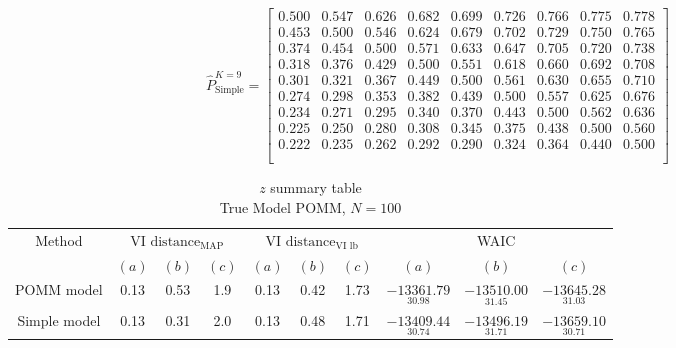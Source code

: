 \documentclass[11pt]{amsart}
\begin{document}
\[ 
\hat{P}^{K=9}_{\text{Simple}} = 
\left[\begin{array}{ccccccccc}
0.500 & 0.547 & 0.626 & 0.682 & 0.699 & 0.726 & 0.766 & 0.775 & 0.778 \\
0.453 & 0.500 & 0.546 & 0.624 & 0.679 & 0.702 & 0.729 & 0.750 & 0.765 \\
0.374 & 0.454 & 0.500 & 0.571 & 0.633 & 0.647 & 0.705 & 0.720 & 0.738 \\
0.318 & 0.376 & 0.429 & 0.500 & 0.551 & 0.618 & 0.660 & 0.692 & 0.708 \\
0.301 & 0.321 & 0.367 & 0.449 & 0.500 & 0.561 & 0.630 & 0.655 & 0.710 \\
0.274 & 0.298 & 0.353 & 0.382 & 0.439 & 0.500 & 0.557 & 0.625 & 0.676 \\
0.234 & 0.271 & 0.295 & 0.340 & 0.370 & 0.443 & 0.500 & 0.562 & 0.636 \\
0.225 & 0.250 & 0.280 & 0.308 & 0.345 & 0.375 & 0.438 & 0.500 & 0.560 \\
0.222 & 0.235 & 0.262 & 0.292 & 0.290 & 0.324 & 0.364 & 0.440 & 0.500 \\ \\\end{array}\right]
\]



\begin{table}[htbp]
\centering
\caption*{
{\large $z$ summary table} \\ 
{\small True Model POMM, $N=100$}
} 
\begin{tabular}{cccccccccc}
\toprule
\multirow{2}{*}{Method} & \multicolumn{3}{c}{
VI $\text{distance}_{\text{MAP}}$} & \multicolumn{3}{c}{
VI $\text{distance}_{\text{VI lb}}$} & \multicolumn{3}{c}{WAIC} \\
\cmidrule(lr){2-4} \cmidrule(lr){5-7} \cmidrule(lr){8-10}
& $(a)$ & $(b)$ & $(c)$ & $(a)$ & $(b)$ & $(c)$ & $(a)$ & $(b)$ & $(c)$ \\
\midrule
POMM model  &0.13 & 0.53 & 1.9 & 0.13 & 0.42 & 1.73  & $\underset{30.98}{-13361.79}$ & $\underset{31.45}{-13510.00}$ & $\underset{31.03}{-13645.28}$  \\
Simple model & 0.13 & 0.31 & 2.0 & 0.13 & 0.48 & 1.71 & $\underset{30.74}{-13409.44}$ & $\underset{31.71}{-13496.19}$ & $\underset{30.71}{-13659.10}$ \\
\bottomrule
\end{tabular}
\label{table:simulations_from_simple}
\end{table}
\end{document}
